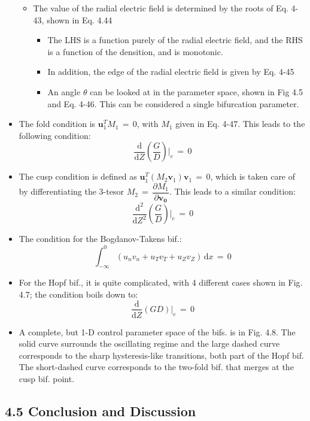 \documentclass[a4paper]{article}
\begin{document}
\begin{itemize}
  \begin{itemize}
  \item
    The value of the radial electric field is determined by the roots of
    Eq. 4-43, shown in Eq. 4.44

    \begin{itemize}
    \item
      The LHS is a function purely of the radial electric field, and the
      RHS is a function of the densition, and is monotonic.
    \item
      In addition, the edge of the radial electric field is given by Eq.
      4-45
    \item
      An angle $\theta$ can be looked at in the parameter space, shown
      in Fig 4.5 and Eq. 4-46. This can be considered a single
      bifurcation parameter.
    \end{itemize}
  \end{itemize}
\item
  The fold condition is $\mathbf{u}^T_1 M_1 \,=\, 0$, with $M_1$ given
  in Eq. 4-47. This leads to the following condition:
  \[\frac{\text{d}}{\text{d}Z} \left(\frac{G}{D}\right)\biggr\rvert_e \,=\, 0\]
\item
  The cusp condition is defined as
  $\mathbf{u}_1^T (M_2 \mathbf{v}_1) \mathbf{v}_1 \,=\, 0$, which is
  taken care of by differentiating the 3-tesor
  $M_2 \,=\, \dfrac{\partial M_1}{\partial \mathbf{v_0}}$. This leads to
  a similar condition:
  \[\frac{\text{d}^2}{\text{d}Z^2} \left(\frac{G}{D}\right)\biggr\rvert_e \,=\, 0\]
\item
  The condition for the Bogdanov-Takens bif.:
  \[\int_{-\infty}^0 (u_n v_n + u_T v_T + u_Z v_Z) \, \text{d}x \,=\, 0\]
\item
  For the Hopf bif., it is quite complicated, with 4 different cases
  shown in Fig. 4.7; the condition boils down to:
  \[\frac{\text{d}}{\text{d}Z} \left(GD\right)\biggr\rvert_e \,=\, 0\]
\item
  A complete, but 1-D control parameter space of the bifs. is in Fig.
  4.8. The solid curve surrounds the oscillating regime and the large
  dashed curve corresponds to the sharp hysteresis-like transitions,
  both part of the Hopf bif. The short-dashed curve corresponds to the
  two-fold bif. that merges at the cusp bif. point.
\end{itemize}

\subsection{4.5 Conclusion and
Discussion}\label{conclusion-and-discussion}
\end{document}
